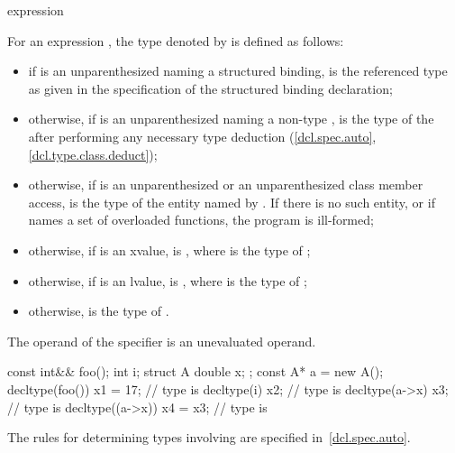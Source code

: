 \begin{bnf}
\br
   \terminal{(} expression \terminal{)}
\end{bnf}

\pnum
{}%
For an expression , the type denoted by  is defined as follows:

\begin{itemize}
\item if  is an unparenthesized 
naming a structured binding,
 is the referenced type as given in
the specification of the structured binding declaration;

\item otherwise, if  is an unparenthesized 
naming a non-type ,
 is the type of the 
after performing any necessary type deduction
(\ref{dcl.spec.auto}, \ref{dcl.type.class.deduct});

\item otherwise, if  is an unparenthesized  or
an unparenthesized
class
member access,  is the
type of the entity named by . If there is no such entity, or
if  names a set of overloaded functions, the program is
ill-formed;

\item otherwise, if  is
an xvalue,  is , where  is the type
of ;

\item otherwise, if  is an lvalue, 
is , where  is the type of ;

\item otherwise,  is the type of .
\end{itemize}

The operand of the  specifier is an unevaluated
operand.

\begin{example}
\begin{codeblock}
const int&& foo();
int i;
struct A { double x; };
const A* a = new A();
decltype(foo()) x1 = 17;        // type is 
decltype(i) x2;                 // type is 
decltype(a->x) x3;              // type is 
decltype((a->x)) x4 = x3;       // type is 
\end{codeblock}
\end{example}
\begin{note}
The rules for determining types involving  are specified
in~\ref{dcl.spec.auto}.
\end{note}

